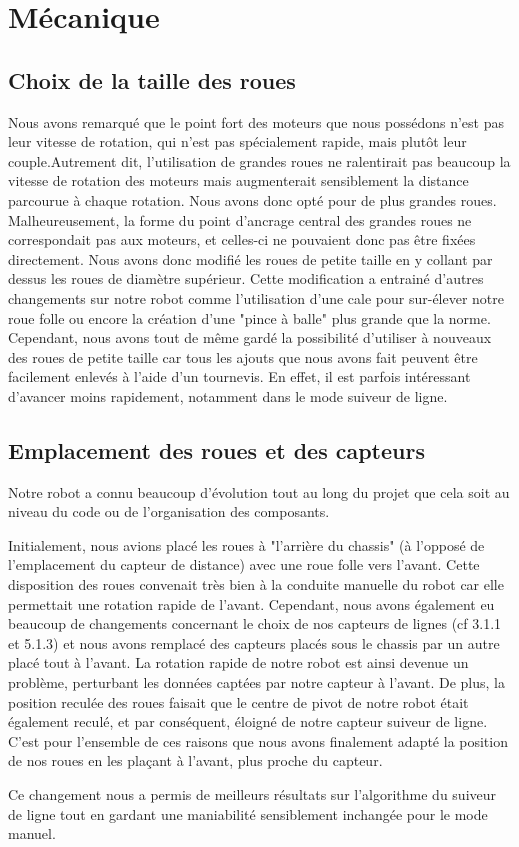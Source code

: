 \section{Mécanique}
\subsection{Choix de la taille des roues}

Nous avons remarqué que le point fort des moteurs que nous possédons n'est pas leur vitesse de rotation, qui n'est pas spécialement rapide, mais plutôt leur couple.Autrement dit, l'utilisation de grandes roues ne ralentirait pas beaucoup la vitesse de rotation des moteurs mais augmenterait sensiblement la distance parcourue à chaque rotation. Nous avons donc opté pour de plus grandes roues. Malheureusement, la forme du point d'ancrage central des grandes roues ne correspondait pas aux moteurs, et celles-ci ne pouvaient donc pas être fixées directement. Nous avons donc modifié les roues de petite taille en y collant par dessus les roues de diamètre supérieur. Cette modification a entrainé d'autres changements sur notre robot comme l'utilisation d'une cale pour sur-élever notre roue folle ou encore la création d'une "pince à balle" plus grande que la norme. Cependant, nous avons tout de même gardé la possibilité d'utiliser à nouveaux des roues de petite taille car tous les ajouts que nous avons fait peuvent être facilement enlevés à l'aide d'un tournevis. En effet, il est parfois intéressant d'avancer moins rapidement, notamment dans le mode suiveur de ligne.

\subsection{Emplacement des roues et des capteurs}
Notre robot a connu beaucoup d'évolution tout au long du projet que cela soit au niveau du code ou de l'organisation des composants.

Initialement, nous avions placé les roues à "l'arrière du chassis" (à l'opposé de l'emplacement du capteur de distance) avec une roue folle vers l'avant. Cette disposition des roues convenait très bien à la conduite manuelle du robot car elle permettait une rotation rapide de l'avant. Cependant, nous avons également eu beaucoup de changements concernant le choix de nos capteurs de lignes (cf 3.1.1 et 5.1.3) et nous avons remplacé des capteurs placés sous le chassis par un autre placé tout à l'avant. La rotation rapide de notre robot est ainsi devenue un problème, perturbant les données captées par notre capteur à l'avant. De plus, la position reculée des roues faisait que le centre de pivot de notre robot était également reculé, et par conséquent, éloigné de notre capteur suiveur de ligne. C'est pour l'ensemble de ces raisons que nous avons finalement adapté la position de nos roues en les plaçant à l'avant, plus proche du capteur.

Ce changement nous a permis de meilleurs résultats sur l'algorithme du suiveur de ligne tout en gardant une maniabilité sensiblement inchangée pour le mode manuel.

